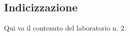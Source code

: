 
\subsection{Indicizzazione} \label{sec:metodi-di-indic}

Qui va il contenuto del laboratorio n. 2.


